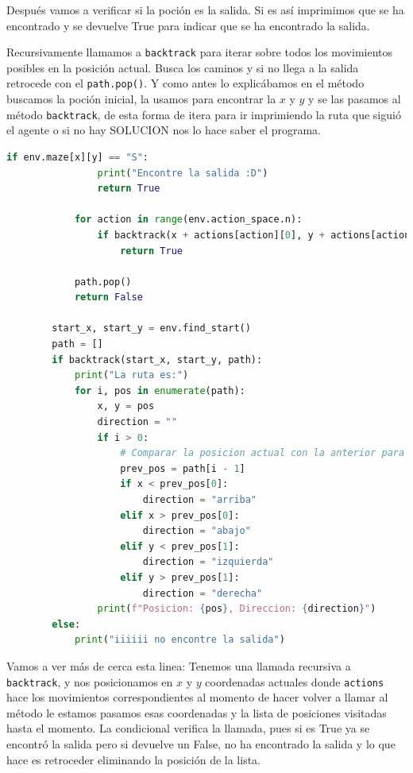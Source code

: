 \documentclass[a4paper,12pt]{article}
\begin{document}
Después vamos a verificar si la poción es la salida. Si es así imprimimos que se ha encontrado y 
se devuelve True para indicar que se ha encontrado la salida.

Recursivamente llamamos a \texttt{backtrack} para iterar sobre todos los movimientos posibles en 
la posición actual. Busca los caminos y si no llega a la salida retrocede con el \texttt{path.pop()}. Y como 
antes lo explicábamos en el método buscamos la poción inicial, la usamos para encontrar la $x$ y $y$ y se las
pasamos al método \texttt{backtrack}, de esta forma de itera para ir imprimiendo la ruta que siguió el 
agente o si no hay SOLUCION nos lo hace saber el programa. 

\begin{lstlisting}[style=mystylepython, language=Python, caption= algoritmo backtracking]
            if env.maze[x][y] == "S":
                print("Encontre la salida :D")
                return True
    
            for action in range(env.action_space.n):
                if backtrack(x + actions[action][0], y + actions[action][1], path):
                    return True
    
            path.pop()
            return False
    
        start_x, start_y = env.find_start()
        path = []
        if backtrack(start_x, start_y, path):
            print("La ruta es:")
            for i, pos in enumerate(path):
                x, y = pos
                direction = ""
                if i > 0:
                    # Comparar la posicion actual con la anterior para determinar la direccion
                    prev_pos = path[i - 1]
                    if x < prev_pos[0]:
                        direction = "arriba"
                    elif x > prev_pos[0]:
                        direction = "abajo"
                    elif y < prev_pos[1]:
                        direction = "izquierda"
                    elif y > prev_pos[1]:
                        direction = "derecha"
                print(f"Posicion: {pos}, Direccion: {direction}")
        else:
            print("iiiiii no encontre la salida")
\end{lstlisting}

Vamos a ver más de cerca esta linea: Tenemos una llamada recursiva a \texttt{backtrack}, y nos posicionamos en 
$x$ y $y$ coordenadas actuales donde \texttt{actions} hace los movimientos correspondientes al momento de hacer 
volver a llamar al método le estamos pasamos esas coordenadas y la lista de posiciones visitadas hasta el 
momento. La condicional verifica la llamada, pues si es True ya se encontró la salida pero si devuelve un 
False, no ha encontrado la salida y lo que hace es retroceder eliminando la posición de la lista.
\end{document}
